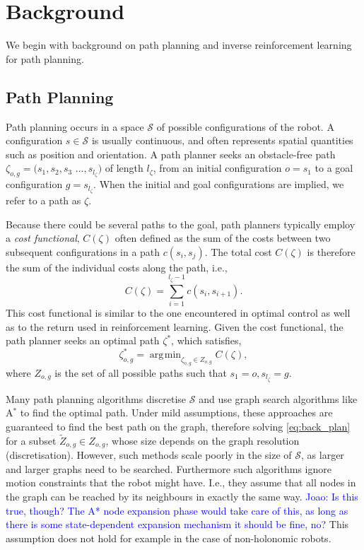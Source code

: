 \documentclass{article}  %
\DeclareMathOperator*{\argmin}{\arg\!\min}
\newcommand{\jm}[1]{\textcolor{blue}{Joao: #1}}
\begin{document}
\section{Background}
We begin with background on path planning and inverse reinforcement learning for path planning.

\subsection{Path Planning \label{subsec:path_planning}}
Path planning occurs in a space $\mathcal{S}$ of possible configurations of the robot. A configuration $s \in \mathcal{S}$ is usually continuous, and often represents spatial quantities such as position and orientation. A path planner seeks an obstacle-free path $\zeta_{o,g} = (s_1,s_2,s_3$ $\ldots,s_{l_{\zeta}}) $ of length $l_{\zeta}$, from an initial configuration $o = s_1$ to a goal configuration  $g =s_{l_{\zeta}}$. When the initial and goal configurations are implied, we refer to a path as $\zeta$.

Because there could be several paths to the goal, path planners typically employ a \emph{cost functional}, $C(\zeta)$ often defined as the sum of the costs between two subsequent configurations in a path $c(s_i,s_j)$. The total cost $C(\zeta)$ is therefore the sum of the individual costs along the path, i.e.,
\begin{equation}
	C(\zeta) = \sum_{i=1}^{l_{\zeta}-1} c(s_i,s_{i+1}).
\end{equation}
This cost functional is similar to the one encountered in optimal control as well as to the return used in reinforcement learning. Given the cost functional, the path planner seeks an optimal path $\zeta^*$, which satisfies,
\begin{equation}
 	\zeta^*_{o,g} = \argmin_{\zeta_{o,g} \in Z_{o,g}} C(\zeta), \label{eq:back_plan}
\end{equation}
where $Z_{o,g}$ is the set of all possible paths such that $s_1 = o, s_{l_\zeta} = g$.

Many path planning algorithms discretise $\mathcal{S}$ and use graph search algorithms like A$^*$ to find the optimal path. Under mild assumptions, these approaches are guaranteed to find the best path on the graph, therefore solving \eqref{eq:back_plan} for a subset $\tilde{Z}_{o,g} \in  Z_{o,g}$, whose size depends on the graph resolution (discretisation). However, such methods scale poorly in the size of $\mathcal{S}$, as larger and larger graphs need to be searched. Furthermore such algorithms ignore motion constraints that the robot might have. I.e., they assume that all nodes in the graph can be reached by its neighbours in exactly the same way. \jm{Is this true, though? The A* node expansion phase would take care of this, as long as there is some state-dependent expansion mechanism it should be fine, no?} This assumption does not hold for example in the case of non-holonomic robots.
\end{document}
